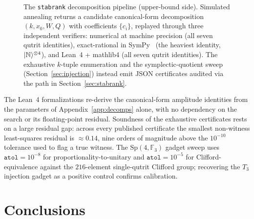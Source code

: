 \documentclass[11pt]{article}
\theoremstyle{definition}
\newcommand{\microspace}{\mspace{0.5mu}}
\newcommand{\ket}[1]{\lvert\microspace #1 \microspace \rangle}
\newcommand{\F}{\mathcal{F}}
\renewcommand{\F}[1]{\mathbb{F}_{#1}}
\newcommand{\Norrell}{\ket{\mathbb{N}}}
\newcommand{\Sp}{\mathrm{Sp}}
\begin{document}
\begin{figure}[!htbp]
{%
		}
		\caption{The \texttt{stabrank} decomposition pipeline
			(upper-bound side). Simulated annealing returns a candidate
			canonical-form decomposition $(k, x_0, W, Q)$ with coefficients
			$\{c_i\}$, replayed through three independent verifiers:
			numerical at machine precision (all seven qutrit identities),
			exact-rational in SymPy~\cite{meurer2017sympy} (the heaviest
			identity, $\Norrell^{\otimes 4}$), and Lean~4 + mathlib4 (all
			seven qutrit identities). The exhaustive $k$-tuple enumeration
			and the symplectic-quotient sweep
			(Section~\ref{sec:injection}) instead emit JSON certificates
			audited via the path in Section~\ref{sec:stabrank}.}
		\label{fig:workflow}
	\end{figure}
	
	The Lean~4 formalizations re-derive the canonical-form amplitude
	identities from the parameters of Appendix~\ref{app:decomps}
	alone, with no dependency on the search or its floating-point
	residual. Soundness of the exhaustive certificates rests on a
	large residual gap: across every published certificate the
	smallest non-witness least-squares residual is $\approx 0.14$,
	nine orders of magnitude above the $10^{-10}$ tolerance used to
	flag a true witness. The $\Sp(4, \F{3})$ gadget sweep uses
	$\mathtt{atol} = 10^{-8}$ for proportionality-to-unitary and
	$\mathtt{atol} = 10^{-5}$ for Clifford-equivalence against the
	$216$-element single-qutrit Clifford group; recovering the $T_3$
	injection gadget as a positive control confirms calibration.
	
	\section{Conclusions}\label{sec:conclusions}
\end{document}
